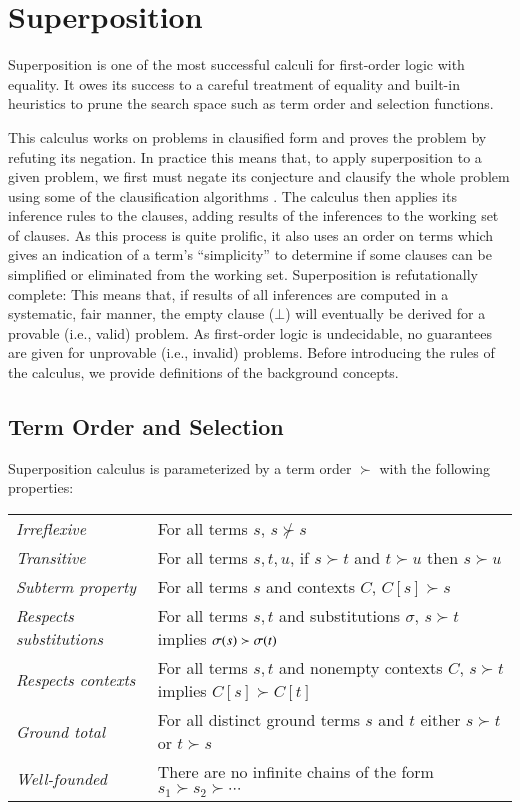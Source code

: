 \section{Superposition}
\label{sec:pre:sup}

Superposition is one of the most successful calculi for first-order logic with
equality. It owes its success to a careful treatment of equality and built-in
heuristics to prune the search space such as term order and selection functions.

This calculus works on problems in clausified form and proves the problem by
refuting its negation. In practice this means that, to apply superposition to a
given problem, we first must negate its conjecture and clausify the whole
problem using some of the clausification algorithms
\cite{nw-01-small-cnf,rsv-16-vcnf}. The calculus then applies its inference
rules to the clauses, adding results of the inferences to the working set of
clauses. As this process is quite prolific, it also uses an order on terms which gives an indication of a
term's ``simplicity'' to determine
if some clauses can be simplified or eliminated from the working set.
Superposition is refutationally complete: This means that, if results of all
inferences are computed in a systematic, fair manner, the empty clause ($\bot$) will
eventually be derived for a provable (i.e., valid) problem. As first-order logic is
undecidable, no guarantees are given for unprovable (i.e., invalid) problems.
Before introducing the rules of the calculus, we provide definitions of the
background concepts.

\subsection{Term Order and Selection}
\label{sec:pre:order}
Superposition calculus is parameterized by a
term order $\succ$ with the following properties:

\noindent\begin{tabular}{p{}p{}}
    \textit{Irreflexive} & For all terms $s$, $s \not\succ s$ \\
    \textit{Transitive} & For all terms $s, t, u$,  if $s\succ t$ and $t \succ u$ then $s \succ u$ \\ 
    \textit{Subterm property} & For all terms $s$ and contexts $C$, $C[s] \succ s$ \\
    \textit{Respects substitutions} & For all terms $s, t$ and substitutions $\sigma$, $s \succ t$ implies $\sigma(s) \succ \sigma(t)$ \\
    \textit{Respects contexts} & For all terms $s,t$ and nonempty contexts $C$, $s \succ t$ implies $C[s] \succ C[t]$ \\
    \textit{Ground total} & For all distinct
    ground terms $s$ and $t$ either $s \succ t$ or $t \succ s$ \\
    \textit{Well-founded} & There are no infinite chains of the form $s_1 \succ s_2 \succ \cdots$ 
\end{tabular}

